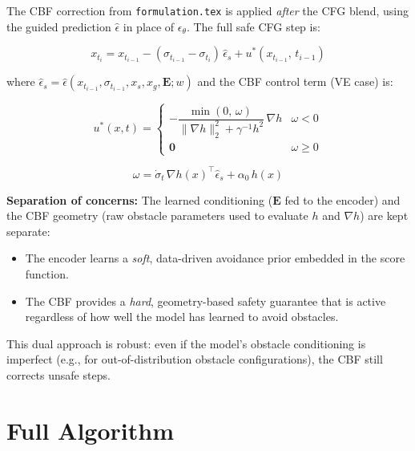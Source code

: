 \documentclass{article}
\begin{document}
The CBF correction from \texttt{formulation.tex} is applied \emph{after} the CFG
blend, using the guided prediction $\hat\epsilon$ in place of $\epsilon_\theta$.
The full safe CFG step is:

\begin{equation}
    x_{t_i} = x_{t_{i-1}} - (\sigma_{t_{i-1}} - \sigma_{t_i})\,\hat\epsilon_s
              + u^*(x_{t_{i-1}},\, t_{i-1})
\end{equation}

where $\hat\epsilon_s = \hat{\epsilon}(x_{t_{i-1}}, \sigma_{t_{i-1}}, x_s, x_g, \mathbf{E}; w)$
and the CBF control term (VE case) is:

\begin{equation}
    u^*(x,t) =
    \begin{cases}
        -\dfrac{\min(0,\,\omega)\,}{\|\nabla h\|_2^2 + \gamma^{-1}h^2}\,\nabla h
        & \omega < 0 \\[6pt]
        \mathbf{0} & \omega \geq 0
    \end{cases}
\end{equation}

\begin{equation}
    \omega = \dot\sigma_t\,\nabla h(x)^\top \hat\epsilon_s + \alpha_0\,h(x)
\end{equation}

\noindent\textbf{Separation of concerns:}
The learned conditioning ($\mathbf{E}$ fed to the encoder) and the CBF geometry
(raw obstacle parameters used to evaluate $h$ and $\nabla h$) are kept separate:
\begin{itemize}
    \item The encoder learns a \emph{soft}, data-driven avoidance prior embedded
          in the score function.
    \item The CBF provides a \emph{hard}, geometry-based safety guarantee that is
          active regardless of how well the model has learned to avoid obstacles.
\end{itemize}
This dual approach is robust: even if the model's obstacle conditioning is imperfect
(e.g., for out-of-distribution obstacle configurations), the CBF still corrects
unsafe steps.

\section{Full Algorithm}
\end{document}
